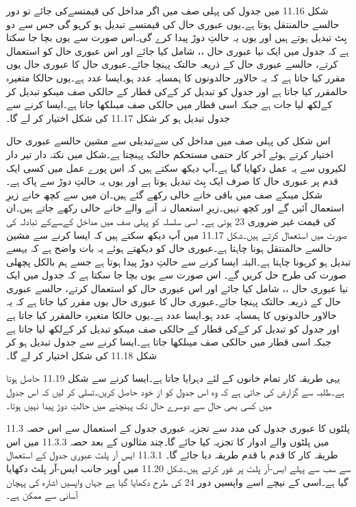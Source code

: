 	شکل 11.16 میں جدول کی پہلی صف میں اگر مداخل کی قیمتسےکی جائے تو دور حالسے حالمنتقل ہوتا ہے۔یوں عبوری حال  کی قیمتسے تبدیل ہو کرہو گی جس سے دو بِٹ تبدیل ہوتے ہیں اور یوں یہ حالتِ دوڑ پیدا کرے گی۔اس صورت سے یوں بچا جا سکتا ہے کہ جدول میں ایک نیا عبوری حال ،، شامل کیا جائے اور اس عبوری حال  کو استعمال کرتے، حالسے عبوری حال کے ذریعہ حالتک پہنچا جائے۔عبوری حال کا عبوری حال  یوں مقرر کیا جاتا ہے کہ یہ حالاور حالدونوں کا ہمسایہ عدد ہو۔ایسا عدد ہے۔یوں حالکا متغیرہ حالمقرر کیا جاتا ہے اور جدول کو تبدیل کر کےکی قطار کے حالکی صف میںکو تبدیل کر کےلکھ لیا جات ہے جبکہ اسی قطار میں حالکی صف میںلکھا جاتا ہے۔ایسا کرنے سے جدول تبدیل ہو کر شکل 11.17 کی شکل اختیار کر لے گا۔


	اس شکل کی پہلی صف میں مداخل کی سےتبدیلی سے مشین حالسے عبوری حال اختیار کرتے ہوئے آخر کار حتمی مستحکم حالتک پہنچتا ہے۔شکل میں نکتہ دار تیر دار  لکیروں سے یہ عمل دکھایا گیا ہے۔آپ دیکھ سکتے ہیں کہ اس پورے عمل میں کسی ایک قدم پر عبوری حال  کا صرف ایک بِٹ تبدیل ہوتا ہے اور یوں یہ حالتِ دوڑ سے پاک ہے۔شکل میںکے صف میں باقی خانے خالی رکھے گئے ہیں۔ان میں سے کچھ خانے زیرِ استعمال آئیں گے اور کچھ نہیں۔زیرِ استعمال نہ آنے والے خانے خالی رکھے جاتے ہیں۔ان کی قیمت غیر ضروری 23 ہوتی ہے۔
	اسی سلسلہ کو پہلی صف میں مداخل کےسےکے تبادلہ کی صورت میں استعمال کرتے ہیں۔شکل 11.17 میں آپ دیکھ سکتے ہیں کہ ایسا کرنے سے مشین حالسے حالمنتقل ہونا چاہتا ہے۔عبوری حال  کو دیکھتے ہوئے یہ بات واضح ہے کہ یہسے تبدیل ہو کرہونا چاہتا ہے۔البتہ ایسا کرنے سے حالتِ دوڑ پیدا ہوتا ہے جسے ہم بالکل پچھلی صورت کی طرح حل کریں گے۔
	اس صورت سے یوں بچا جا سکتا ہے کہ جدول میں ایک نیا عبوری حال ،، شامل کیا جائے اور اس عبوری حال  کو استعمال کرتے، حالسے عبوری حال کے ذریعہ حالتک پہنچا جائے۔عبوری حال کا عبوری حال  یوں مقرر کیا جاتا ہے کہ یہ حالاور حالدونوں کا ہمسایہ عدد ہو۔ایسا عدد ہے۔یوں حالکا متغیرہ حالمقرر کیا جاتا ہے اور جدول کو تبدیل کر کےکی قطار کے حالکی صف میںکو تبدیل کر کےلکھ لیا جاتا ہے جبکہ اسی قطار میں حالکی صف میںلکھا جاتا ہے۔ایسا کرنے سے جدول تبدیل ہو کر شکل 11.18 کی شکل اختیار کر لے گا۔

	یہی طریقہ کار تمام خانوں کے لئے دہرایا جاتا ہے۔ایسا کرنے سے شکل 11.19 حاصل ہوتا ہے۔طلبہ سے گزارش کی جاتی ہے کہ وہ اس جدول کو از خود حاصل کریں۔تسلی کر لیں کہ اس جدول میں کسی بھی حال سے دوسرے حال تک پہنچنے میں حالتِ دوڑ پیدا نہیں ہوتا۔


11.3 پلٹوں کا عبوری جدول کی مدد سے تجزیہ
	عبوری جدول کے استعمال سے اس حصہ میں پلٹوں والے ادوار کا تجزیہ کیا جائے گا۔چند مثالوں کے بعد حصہ 11.3.3 میں اس طریقہ کار کا قدم با قدم طریقہ دیا جائے گا۔
11.3.1 ایس آر پلٹ
	عبوری جدول کے استعمال سے  سب سے پہلے ایس-آر پلٹ پر غور کرتے ہیں۔شکل 11.20 میں اُوپر جانب ایس-آر پلٹ دکھایا گیا ہے۔اسی کے نیچے اسے واپسیں دور 24 کی طرح دکھایا گیا ہے جہاں واپسیں اشارہ کی پہچان آسانی سے ممکن ہے۔


